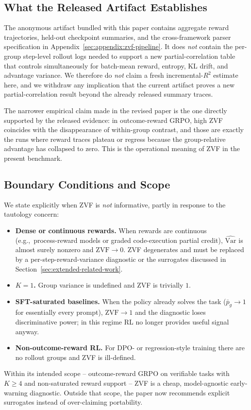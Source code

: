 \subsection{What the Released Artifact Establishes}

The anonymous artifact bundled with this paper contains aggregate reward
trajectories, held-out checkpoint summaries, and the cross-framework parser
specification in Appendix~\ref{sec:appendix:zvf-pipeline}. It does
\emph{not} contain the per-group step-level rollout logs needed to support
a new partial-correlation table that controls simultaneously for
batch-mean reward, entropy, KL drift, and advantage variance. We therefore
do \emph{not} claim a fresh incremental-$R^2$ estimate here, and we
withdraw any implication that the current artifact proves a new
partial-correlation result beyond the already released summary traces.

The narrower empirical claim made in the revised paper is the one directly
supported by the released evidence: in outcome-reward GRPO, high ZVF
coincides with the disappearance of within-group contrast, and those are
exactly the runs where reward traces plateau or regress because the
group-relative advantage has collapsed to zero. This is the operational
meaning of ZVF in the present benchmark.

\subsection{Boundary Conditions and Scope}

We state explicitly when ZVF is \emph{not} informative, partly in response
to the tautology concern:
\begin{itemize}[leftmargin=1.2em,itemsep=0pt]
  \item \textbf{Dense or continuous rewards.} When rewards are continuous
        (e.g.,~process-reward models or graded code-execution partial credit),
        $\widehat{\mathrm{Var}}$ is almost surely nonzero and
        $\mathrm{ZVF} \to 0$. ZVF degenerates and must be replaced by a
        per-step-reward-variance diagnostic or the surrogates discussed in
        Section~\ref{sec:extended-related-work}.
  \item \textbf{$K=1$.} Group variance is undefined and ZVF is trivially $1$.
  \item \textbf{SFT-saturated baselines.} When the policy already solves
        the task ($\bar p_g \to 1$ for essentially every prompt),
        $\mathrm{ZVF} \to 1$ and the diagnostic loses discriminative power;
        in this regime RL no longer provides useful signal anyway.
  \item \textbf{Non-outcome-reward RL.} For DPO- or regression-style
        training there are no rollout groups and ZVF is ill-defined.
\end{itemize}
Within its intended scope -- outcome-reward GRPO on verifiable tasks with
$K \ge 4$ and non-saturated reward support -- ZVF is a cheap, model-agnostic
early-warning diagnostic. Outside that scope, the paper now recommends
explicit surrogates instead of over-claiming portability.
